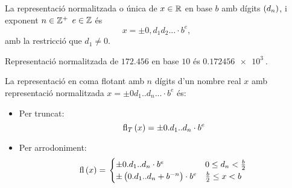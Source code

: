 \begin{defi}
    La representació normalitzada o única de $x \in \mathbb{R}$ en base $b$ amb dígits $\left(  d_n\right) $, i exponent $n \in \mathbb{Z}^{+}$  $e \in \mathbb{Z}$ és
    \[
      x = \pm 0,d_1d_2... \cdot b^e \nonumber,
    \]
    amb la restricció que $d_1 \neq 0$.
\end{defi}

\begin{example}
  Representació normalitzada de $172.456$ en base $10$ és $\SI{0.172456e3}{}$.
\end{example}

\begin{defi}
	La representació en coma flotant amb $n$ dígits d'un nombre real $x$ amb representació normalitzada $x = \pm 0d_1..d_n... \cdot b^e$ és:
	\begin{itemize}
		\item  Per truncat:
		\[
			\text{fl}_T\left( x\right)  = \pm 0.d_1..d_n \cdot b^e \nonumber
		\]
		\item Per arrodoniment:
			\[
			\text{fl}\left( x\right)  = \left.
			\begin{cases}
			\pm 0.d_1..d_n \cdot b^e & 0 \leq d_n < \frac{b}{2} \\
			\pm \left( 0.d_1..d_n + b^{-n}\right)  \cdot b^e & \frac{b}{2} \leq x < b
			\end{cases}
			\right.
			\]
	\end{itemize}
\end{defi}

